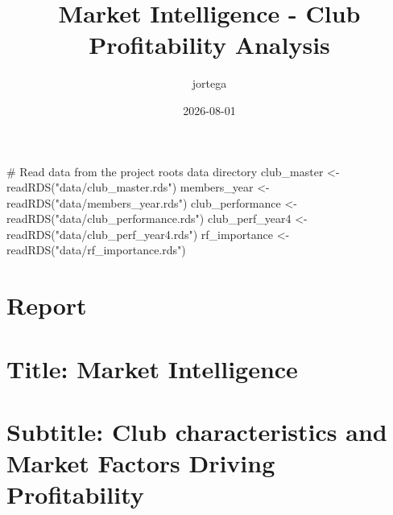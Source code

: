 \documentclass[
  letterpaper,
  oneside,
  11pt]{article}
\title{Market Intelligence - Club Profitability Analysis}
\author{jortega}
\date{2026-08-01}
\newenvironment{Shaded}{\begin{snugshade}}{\end{snugshade}}
\newcommand{\CommentTok}[1]{\textcolor[rgb]{0.37,0.37,0.37}{#1}}
\newcommand{\FunctionTok}[1]{\textcolor[rgb]{0.28,0.35,0.67}{#1}}
\newcommand{\NormalTok}[1]{\textcolor[rgb]{0.00,0.23,0.31}{#1}}
\newcommand{\OtherTok}[1]{\textcolor[rgb]{0.00,0.23,0.31}{#1}}
\newcommand{\StringTok}[1]{\textcolor[rgb]{0.13,0.47,0.30}{#1}}
\begin{document}
\maketitle


\begin{Shaded}
\begin{Highlighting}[]
\CommentTok{\# Read data from the project root\textquotesingle{}s data directory}
\NormalTok{club\_master }\OtherTok{\textless{}{-}} \FunctionTok{readRDS}\NormalTok{(}\StringTok{"data/club\_master.rds"}\NormalTok{)}
\NormalTok{members\_year }\OtherTok{\textless{}{-}} \FunctionTok{readRDS}\NormalTok{(}\StringTok{"data/members\_year.rds"}\NormalTok{)}
\NormalTok{club\_performance }\OtherTok{\textless{}{-}} \FunctionTok{readRDS}\NormalTok{(}\StringTok{"data/club\_performance.rds"}\NormalTok{)}
\NormalTok{club\_perf\_year4 }\OtherTok{\textless{}{-}} \FunctionTok{readRDS}\NormalTok{(}\StringTok{"data/club\_perf\_year4.rds"}\NormalTok{)}
\NormalTok{rf\_importance }\OtherTok{\textless{}{-}} \FunctionTok{readRDS}\NormalTok{(}\StringTok{"data/rf\_importance.rds"}\NormalTok{)}
\end{Highlighting}
\end{Shaded}

\section{Report}\label{report}

\section{Title: Market Intelligence}\label{title-market-intelligence}

\section{Subtitle: Club characteristics and Market Factors Driving
Profitability}\label{subtitle-club-characteristics-and-market-factors-driving-profitability}
\end{document}
